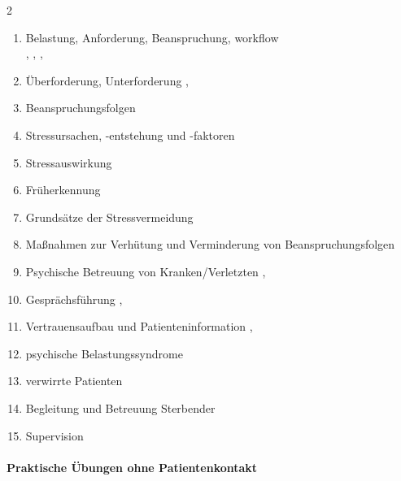 \begin{WidePar}
\begin{multicols}{2}
  \begin{enumerate}
    \item    Belastung, Anforderung, Beanspruchung, workflow
    \\
    ,
    ,
    ,
    \item    Überforderung, Unterforderung \dotfill  {},
    \item    Beanspruchungsfolgen \dotfill {}
    \item    Stressursachen, -entstehung und -faktoren \dotfill {}
    \item    Stressauswirkung \dotfill {}
    \item    Früherkennung \dotfill {}
    \item    Grundsätze der Stressvermeidung \dotfill {}
    \item    Maßnahmen zur Verhütung und Verminderung von Beanspruchungsfolgen \dotfill {}
    \item    Psychische Betreuung von Kranken/Verletzten \dotfill {},
    \item    Gesprächsführung \dotfill {},
    \item    Vertrauensaufbau und Patienteninformation \dotfill {},
    \item    psychische Belastungssyndrome \dotfill {}
    \item    verwirrte Patienten \dotfill {}
    \item    Begleitung und Betreuung Sterbender \dotfill {}
    \item    Supervision \dotfill {}
  \end{enumerate}

\paragraph{Praktische Übungen ohne Patientenkontakt}~
  

\end{multicols}
\end{WidePar}
